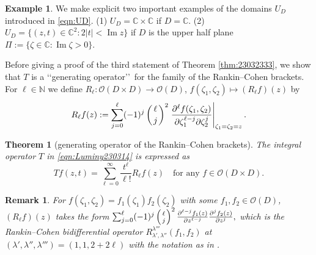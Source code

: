 \documentclass[12pt,leqno]{amsart}
\theoremstyle{plain}
\newtheorem{theorem}[thm]{Theorem}
\newtheorem{remark}[thm]{Remark}
\theoremstyle{definition}
\newtheorem{example}[thm]{Example}
\begin{document}
\begin{example}
\label{ex:UD}
We make explicit two important examples of the domains $U_D$ introduced in \eqref{eqn:UD}.
\newline
{\rm{(1)}}\enspace
$U_D={\mathbb{C}} \times {\mathbb{C}}$
 if $D={\mathbb{C}}$.  
\newline
{\rm{(2)}}\enspace
$U_D=
  \{(z, t) \in {\mathbb{C}}^2: 2|t|<\operatorname{Im} z\}
$
if $D$ is the upper half plane
$
  \Pi:=\{\zeta \in {\mathbb{C}}: \operatorname{Im} \zeta >0\}.  
$
\end{example}



Before giving a proof of the third statement 
 of Theorem \ref{thm:23032333}, 
 we show
 that $T$ is a \lq\lq{generating operator}\rq\rq\
 for the family of the Rankin--Cohen brackets.  
For $\ell \in {\mathbb{N}}$ we define 
$
  R_{\ell} \colon {\mathcal{O}}(D \times D) \to 
  {\mathcal{O}}(D)
$,
 $f(\zeta_1, \zeta_2) \mapsto (R_{\ell}f)(z)$
 by 
\begin{equation}
\label{eqn:RC}
  R_{\ell} f(z):=\sum_{j=0}^{\ell} (-1)^j \left(\ell \atop j\right)^2 
 \left. \frac{\partial^{\ell} f(\zeta_1, \zeta_2)}{\partial \zeta_1^{\ell-j} \partial \zeta_2^j}\right|_{\zeta_1=\zeta_2=z}.  
\end{equation}



\begin{theorem}
[generating operator of the Rankin--Cohen brackets]
\label{thm:gRC}
The integral operator $T$
 in \eqref{eqn:Luminy230314} 
 is expressed as 
\[
   T f(z,t)=\sum_{\ell =0}^{\infty} \frac{t^{\ell}}{\ell !}R_{\ell} f(z)
\quad
  \text{for any $f \in {\mathcal{O}}(D \times D)$.}  
\]
\end{theorem}



\begin{remark}
For $f(\zeta_1, \zeta_2)=f_1(\zeta_1) f_2(\zeta_2)$
 with some $f_1, f_2 \in {\mathcal{O}}(D)$, 
 $(R_{\ell}f)(z)$ takes the form
$
\sum_{j=0}^{\ell} (-1)^j \left(\ell \atop j\right)^2
\frac{\partial^{\ell-j}f_1(z)}{\partial z^{\ell-j}}
\frac{\partial^{j}f_2(z)}{\partial z^{j}},
$
 which is the Rankin--Cohen bidifferential operator 
 $R_{\lambda', \lambda''}^{\lambda'''}(f_1, f_2)$
 at $(\lambda',\lambda'',\lambda''')=(1,1,2+2\ell)$
 with the notation
 as in \cite[(2.1)]{KP20}.  
\end{remark}
\end{document}
